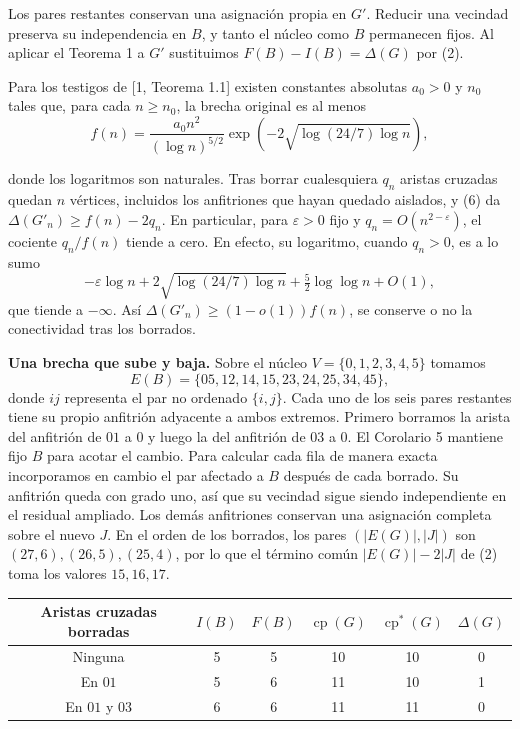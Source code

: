 \documentclass[spanish,11pt,a4paper]{article}
\begin{document}
Los pares restantes conservan una asignación propia en \(G'\). Reducir una vecindad preserva su independencia en \(B\), y tanto el núcleo como \(B\) permanecen fijos. Al aplicar el Teorema 1 a \(G'\) sustituimos \(F(B)-I(B)=\Delta(G)\) por (2).

Para los testigos de {[}1, Teorema 1.1{]} existen constantes absolutas \(a_0>0\) y \(n_0\) tales que, para cada \(n\ge n_0\), la brecha original es al menos
\[
f(n)=\frac{a_0 n^2}{(\log n)^{5/2}}
      \exp\!\left(-2\sqrt{\log(24/7)\log n}\right),
\]

donde los logaritmos son naturales. Tras borrar cualesquiera \(q_n\) aristas cruzadas quedan \(n\) vértices, incluidos los anfitriones que hayan quedado aislados, y (6) da \(\Delta(G'_n)\ge f(n)-2q_n\). En particular, para \(\varepsilon>0\) fijo y \(q_n=O(n^{2-\varepsilon})\), el cociente \(q_n/f(n)\) tiende a cero. En efecto, su logaritmo, cuando \(q_n>0\), es a lo sumo \[
-\varepsilon\log n+2\sqrt{\log(24/7)\log n}+\tfrac52\log\log n+O(1),
\] que tiende a \(-\infty\). Así \(\Delta(G'_n)\ge(1-o(1))f(n)\), se conserve o no la conectividad tras los borrados.

\textbf{Una brecha que sube y baja.} Sobre el núcleo \(V=\{0,1,2,3,4,5\}\) tomamos \[
E(B)=\{05,12,14,15,23,24,25,34,45\},
\] donde \(ij\) representa el par no ordenado \(\{i,j\}\). Cada uno de los seis pares restantes tiene su propio anfitrión adyacente a ambos extremos. Primero borramos la arista del anfitrión de \(01\) a \(0\) y luego la del anfitrión de \(03\) a \(0\). El Corolario 5 mantiene fijo \(B\) para acotar el cambio. Para calcular cada fila de manera exacta incorporamos en cambio el par afectado a \(B\) después de cada borrado. Su anfitrión queda con grado uno, así que su vecindad sigue siendo independiente en el residual ampliado. Los demás anfitriones conservan una asignación completa sobre el nuevo \(J\). En el orden de los borrados, los pares \((|E(G)|,|J|)\) son \((27,6),(26,5),(25,4)\), por lo que el término común \(|E(G)|-2|J|\) de (2) toma los valores \(15,16,17\).

\begin{center}
\begin{tabular}{cccccc}
\toprule
Aristas cruzadas borradas & $I(B)$ & $F(B)$ & $\operatorname{cp}(G)$ & $\operatorname{cp}^{\ast}(G)$ & $\Delta(G)$ \\
\midrule
Ninguna & 5 & 5 & 10 & 10 & 0 \\
En $01$ & 5 & 6 & 11 & 10 & 1 \\
En $01$ y $03$ & 6 & 6 & 11 & 11 & 0 \\
\bottomrule
\end{tabular}
\end{center}
\end{document}
